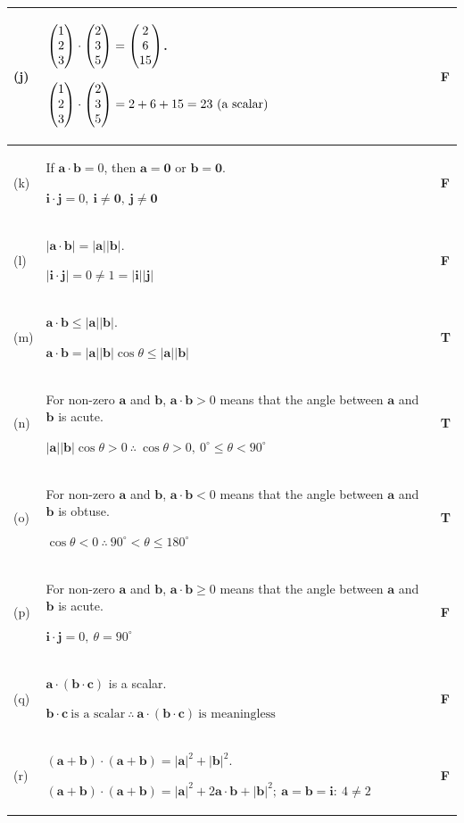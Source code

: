 \documentclass[a4paper,11pt,oneside]{book}
\begin{document}
{\begin{longtable}{|>{\centering\arraybackslash}p{0.9cm}|p{\dimexpr\linewidth-0.9cm-1.6cm-6\tabcolsep-4\arrayrulewidth\relax}|>{\centering\arraybackslash}p{1.6cm}|}
(j)&$\begin{pmatrix}1\\2\\3\end{pmatrix}\cdot\begin{pmatrix}2\\3\\5\end{pmatrix}=\begin{pmatrix}2\\6\\15\end{pmatrix}$.\par\smallskip $\displaystyle \begin{pmatrix}1\\2\\3\end{pmatrix}\cdot\begin{pmatrix}2\\3\\5\end{pmatrix}=2+6+15=23\ \text{(a scalar)}$\rule[-6pt]{0pt}{6pt}&\textbf{F}\\\hline
(k)&If $\mathbf a\cdot\mathbf b=0$, then $\mathbf a=\mathbf 0$ or $\mathbf b=\mathbf 0$.\par\smallskip $\displaystyle \mathbf i\cdot\mathbf j=0,\ \mathbf i\neq\mathbf 0,\ \mathbf j\neq\mathbf 0$\rule[-6pt]{0pt}{6pt}&\textbf{F}\\\hline
(l)&$|\mathbf a\cdot\mathbf b|=|\mathbf a||\mathbf b|$.\par\smallskip $\displaystyle |\mathbf i\cdot\mathbf j|=0\neq1=|\mathbf i||\mathbf j|$\rule[-6pt]{0pt}{6pt}&\textbf{F}\\\hline
(m)&$\mathbf a\cdot\mathbf b\le|\mathbf a||\mathbf b|$.\par\smallskip $\displaystyle \mathbf a\cdot\mathbf b=|\mathbf a||\mathbf b|\cos\theta\le|\mathbf a||\mathbf b|$\rule[-6pt]{0pt}{6pt}&\textbf{T}\\\hline
(n)&For non-zero $\mathbf a$ and $\mathbf b$, $\mathbf a\cdot\mathbf b>0$ means that the angle between $\mathbf a$ and $\mathbf b$ is acute.\par\smallskip $\displaystyle |\mathbf a||\mathbf b|\cos\theta>0\ \therefore\ \cos\theta>0,\ 0^\circ\le\theta<90^\circ$\rule[-6pt]{0pt}{6pt}&\textbf{T}\\\hline
(o)&For non-zero $\mathbf a$ and $\mathbf b$, $\mathbf a\cdot\mathbf b<0$ means that the angle between $\mathbf a$ and $\mathbf b$ is obtuse.\par\smallskip $\displaystyle \cos\theta<0\ \therefore\ 90^\circ<\theta\le180^\circ$\rule[-6pt]{0pt}{6pt}&\textbf{T}\\\hline
(p)&For non-zero $\mathbf a$ and $\mathbf b$, $\mathbf a\cdot\mathbf b\ge0$ means that the angle between $\mathbf a$ and $\mathbf b$ is acute.\par\smallskip $\displaystyle \mathbf i\cdot\mathbf j=0,\ \theta=90^\circ$\rule[-6pt]{0pt}{6pt}&\textbf{F}\\\hline
(q)&$\mathbf a\cdot(\mathbf b\cdot\mathbf c)$ is a scalar.\par\smallskip $\displaystyle \mathbf b\cdot\mathbf c\ \text{is a scalar}\ \therefore\ \mathbf a\cdot(\mathbf b\cdot\mathbf c)\ \text{is meaningless}$\rule[-6pt]{0pt}{6pt}&\textbf{F}\\\hline
(r)&$(\mathbf a+\mathbf b)\cdot(\mathbf a+\mathbf b)=|\mathbf a|^2+|\mathbf b|^2$.\par\smallskip $\displaystyle (\mathbf a+\mathbf b)\cdot(\mathbf a+\mathbf b)=|\mathbf a|^2+2\mathbf a\cdot\mathbf b+|\mathbf b|^2;\ \mathbf a=\mathbf b=\mathbf i:\ 4\neq2$\rule[-6pt]{0pt}{6pt}&\textbf{F}\\\hline

\end{longtable}}
\end{document}
